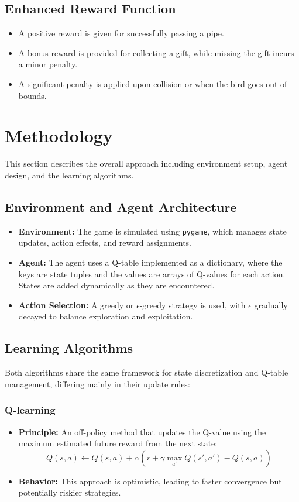 \documentclass[9pt,a4paper]{article}
\begin{document}
\subsection{Enhanced Reward Function}
\begin{itemize}
    \item A positive reward is given for successfully passing a pipe.
    \item A bonus reward is provided for collecting a gift, while missing the gift incurs a minor penalty.
    \item A significant penalty is applied upon collision or when the bird goes out of bounds.
\end{itemize}

\section{Methodology}
This section describes the overall approach including environment setup, agent design, and the learning algorithms.

\subsection{Environment and Agent Architecture}
\begin{itemize}
    \item \textbf{Environment:} The game is simulated using \texttt{pygame}, which manages state updates, action effects, and reward assignments.
    \item \textbf{Agent:} The agent uses a Q-table implemented as a dictionary, where the keys are state tuples and the values are arrays of Q-values for each action. States are added dynamically as they are encountered.
    \item \textbf{Action Selection:} A greedy or \(\epsilon\)-greedy strategy is used, with \(\epsilon\) gradually decayed to balance exploration and exploitation.
\end{itemize}

\subsection{Learning Algorithms}
Both algorithms share the same framework for state discretization and Q-table management, differing mainly in their update rules:

\subsubsection{Q-learning}
\begin{itemize}
    \item \textbf{Principle:} An off-policy method that updates the Q-value using the maximum estimated future reward from the next state:
    \[
    Q(s,a) \leftarrow Q(s,a) + \alpha \left( r + \gamma \max_{a'} Q(s',a') - Q(s,a) \right)
    \]
    \item \textbf{Behavior:} This approach is optimistic, leading to faster convergence but potentially riskier strategies.
\end{itemize}
\end{document}
